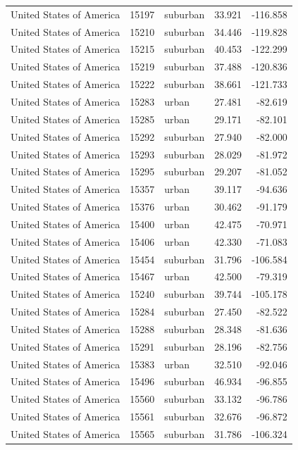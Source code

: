 \documentclass{article}
\begin{document}
\begin{longtable}{lllrr}
United States of America & 15197 & suburban & 33.921 & -116.858 \\ 
United States of America & 15210 & suburban & 34.446 & -119.828 \\ 
United States of America & 15215 & suburban & 40.453 & -122.299 \\ 
United States of America & 15219 & suburban & 37.488 & -120.836 \\ 
United States of America & 15222 & suburban & 38.661 & -121.733 \\ 
United States of America & 15283 & urban & 27.481 & -82.619 \\ 
United States of America & 15285 & urban & 29.171 & -82.101 \\ 
United States of America & 15292 & suburban & 27.940 & -82.000 \\ 
United States of America & 15293 & suburban & 28.029 & -81.972 \\ 
United States of America & 15295 & suburban & 29.207 & -81.052 \\ 
United States of America & 15357 & urban & 39.117 & -94.636 \\ 
United States of America & 15376 & urban & 30.462 & -91.179 \\ 
United States of America & 15400 & urban & 42.475 & -70.971 \\ 
United States of America & 15406 & urban & 42.330 & -71.083 \\ 
United States of America & 15454 & suburban & 31.796 & -106.584 \\ 
United States of America & 15467 & urban & 42.500 & -79.319 \\ 
United States of America & 15240 & suburban & 39.744 & -105.178 \\ 
United States of America & 15284 & suburban & 27.450 & -82.522 \\ 
United States of America & 15288 & suburban & 28.348 & -81.636 \\ 
United States of America & 15291 & suburban & 28.196 & -82.756 \\ 
United States of America & 15383 & urban & 32.510 & -92.046 \\ 
United States of America & 15496 & suburban & 46.934 & -96.855 \\ 
United States of America & 15560 & suburban & 33.132 & -96.786 \\ 
United States of America & 15561 & suburban & 32.676 & -96.872 \\ 
United States of America & 15565 & suburban & 31.786 & -106.324 \\ 

\end{longtable}
\end{document}
